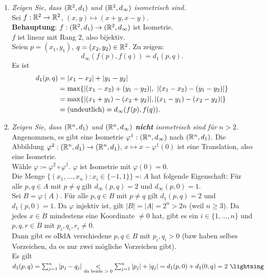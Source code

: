 \begin{problem*}[4]
  \begin{enumerate}
    \item \emph{Zeigen Sie, dass $ (\mathbb{R}^2, d_1) $ und $ (\mathbb{R}^2, d_\infty) $ isometrisch sind.} \\
      Sei $ f : \mathbb{R}^2 \to \mathbb{R}^2 $, $ (x,y) \mapsto (x+y, x-y) $. \\
      \textbf{Behauptung}: $ f : (\mathbb{R}^2, d_1) \to (\mathbb{R}^2, d_\infty) $ ist Isometrie. \\
      $ f $ ist linear mit Rang $ 2 $, also bijektiv. \\
      Seien $ p = (x_1, y_1) $, $ q = (x_2, y_2) \in \mathbb{R}^2 $. Zu zeigen:
      \begin{equation*}
        d_\infty(f(p),f(q)) = d_1(p,q)\text{.}
      \end{equation*}
      Es ist
      \begin{align*}
        d_1(p,q) &= \vert x_1 - x_2 \vert + \vert y_1 - y_2 \vert \\
          &= \max\{ \vert (x_1-x_2) + (y_1-y_2) \vert, \ \vert (x_1 - x_2) - (y_1-y_2) \vert \} \\
          &= \max\{ \vert (x_1 + y_1) - (x_2+y_2) \vert, \vert (x_1-y_1)-(x_2-y_2) \vert \} \\
          &= \text{(undeutlich)} = d_\infty(f(p),f(q))\text{.} \quad \qed
      \end{align*}
    \item \emph{Zeigen Sie, dass $ (\mathbb{R}^n, d_1) $ und $ (\mathbb{R}^n, d_\infty) $ \textbf{nicht} isometrisch sind für $ n > 2 $.} \\
    Angenommen, es gibt eine Isometrie $ \varphi^1: (\mathbb{R}^n, d_\infty) $ nach $ (\mathbb{R}^n, d_1) $. Die Abbildung $ \varphi^2 : (\mathbb{R}^n, d_1) \to (\mathbb{R}^n, d_1) $, $ x \mapsto x - \varphi^1(0) $ ist eine Translation, also eine Isometrie. \\
    Wähle $ \varphi \coloneqq \varphi^2 \circ \varphi^1 $. $ \varphi $ ist Isometrie mit $ \varphi(0) = 0 $. \\
    Die Menge $ \{ (x_1, \dots, x_n) : x_i \in \{ -1, 1 \} \} \eqqcolon A $ hat folgende Eigenschaft: Für alle $ p, q \in A $ mit $ p \neq q $ gilt $ d_\infty(p,q) = 2 $ und $ d_\infty(p, 0) = 1 $. \\
    Sei $ B = \varphi(A) $. Für alle $ p,q \in B $ mit $ p \neq q $ gilt $ d_1(p,q) = 2 $ und $ d_1(p,0) = 1 $. Da $ \varphi $ injektiv ist, gilt $ \vert B \vert = \vert A \vert = 2^n > 2n $ (weil $ n \geq 3 $). Da jedes $ x \in B $ mindestens eine Koordinate $ \neq 0 $ hat, gibt es ein $ i \in \{ 1, \dots, n \} $ und $ p,q,r \in B $ mit $ p_i, q_i, r_i \neq 0 $. \\
    Dann gibt es oBdA verschiedene $ p,q \in B $ mit $ p_i, q_i > 0 $ (bzw haben selbes Vorzeichen, da es nur zwei mögliche Vorzeichen gibt). \\
    Es gilt $ d_1(p,q) = \sum_{j = 1}^n \vert p_j - q_j \vert \underset{\text{da beide $ > 0 $}}{<} \sum_{j = 1}^n \vert p_j \vert + \vert q_j \vert = d_1(p,0) + d_1(0,q) = 2 \ \lightning $
  \end{enumerate}
\end{problem*}
